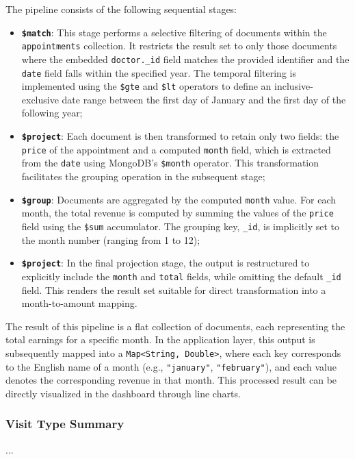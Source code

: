 The pipeline consists of the following sequential stages:

\begin{itemize}
	\item \textbf{\texttt{\$match}}: This stage performs a selective filtering of documents within the \texttt{appointments} collection. It restricts the result set to only those documents where the embedded \texttt{doctor.\_id} field matches the provided identifier and the \texttt{date} field falls within the specified year. The temporal filtering is implemented using the \texttt{\$gte} and \texttt{\$lt} operators to define an inclusive-exclusive date range between the first day of January and the first day of the following year;
	
	\item \textbf{\texttt{\$project}}: Each document is then transformed to retain only two fields: the \texttt{price} of the appointment and a computed \texttt{month} field, which is extracted from the \texttt{date} using MongoDB’s \texttt{\$month} operator. This transformation facilitates the grouping operation in the subsequent stage;
	
	\item \textbf{\texttt{\$group}}: Documents are aggregated by the computed \texttt{month} value. For each month, the total revenue is computed by summing the values of the \texttt{price} field using the \texttt{\$sum} accumulator. The grouping key, \texttt{\_id}, is implicitly set to the month number (ranging from 1 to 12);
	
	\item \textbf{\texttt{\$project}}: In the final projection stage, the output is restructured to explicitly include the \texttt{month} and \texttt{total} fields, while omitting the default \texttt{\_id} field. This renders the result set suitable for direct transformation into a month-to-amount mapping.
\end{itemize}

The result of this pipeline is a flat collection of documents, each representing the total earnings for a specific month. In the application layer, this output is subsequently mapped into a \texttt{Map<String, Double>}, where each key corresponds to the English name of a month (e.g., \texttt{"january"}, \texttt{"february"}), and each value denotes the corresponding revenue in that month. This processed result can be directly visualized in the dashboard through line charts.

\subsubsection{Visit Type Summary}
...

\begin{lstlisting}[language=java]
	
\end{lstlisting}

\begin{lstlisting}[language=mongodb]
	
\end{lstlisting}


